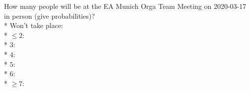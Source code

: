 \documentclass{article}
\begin{document}
How many people will be at the EA Munich Orga Team Meeting on 2020-03-17
in person (give probabilities)?\\*
Won't take place: \null\hfill\underline{\hspace{5cm}}\\*
$\le 2$: \null\hfill\underline{\hspace{5cm}}\\*
$3$: \null\hfill\underline{\hspace{5cm}}\\*
$4$: \null\hfill\underline{\hspace{5cm}}\\*
$5$: \null\hfill\underline{\hspace{5cm}}\\*
$6$: \null\hfill\underline{\hspace{5cm}}\\*
$\ge 7$: \null\hfill\underline{\hspace{5cm}}
\end{document}
